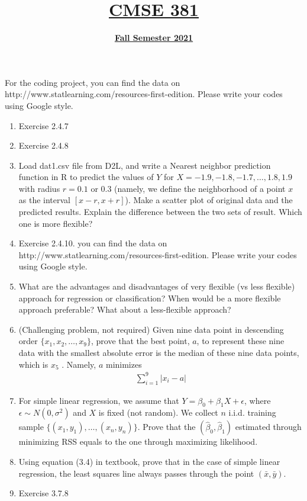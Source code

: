 \documentclass[11pt]{article}
\title{\underline{CMSE 381 }}
\author{\underline{\textbf{Fall Semester 2021}}}
\date{}
\newcommand{\blankline}{\quad\pagebreak[2]}
\begin{document}
\maketitle

\blankline

For the coding project, you can find the data on http://www.statlearning.com/resources-first-edition.  Please write your codes using Google style.
\begin{enumerate}
	\item Exercise 2.4.7
	\item Exercise 2.4.8
	\item Load dat1.csv file from D2L, and write a Nearest neighbor prediction function in R to predict the values of $Y$ for $X = -1.9, -1.8, -1.7, \ldots, 1.8, 1.9$ with radius $r = 0.1$ or $0.3$ (namely, we define the neighborhood of a point $x$ as the interval $[x-r, x + r]$). Make a scatter plot of original data and the predicted results. Explain the difference between the two sets of result. Which one is more flexible?
	\item Exercise 2.4.10. you can find the data on http://www.statlearning.com/resources-first-edition.  Please write your codes using Google style.
	\item  What are the advantages and disadvantages of very flexible (vs less flexible) approach for regression or classification? When would be a more flexible approach preferable? What about a less-flexible approach?
	\item (Challenging problem, not required) Given nine data point in descending order $\{x_1, x_2, \ldots, x_9\}$, prove that the best point, $a$, to represent these nine data with the smallest absolute error is the median of these nine data points, which is $x_5$ . Namely, $a$ minimizes 
	\begin{align*}
	   \sum_{i = 1}^{9}|x_i - a|
\end{align*}	  
		\item For simple linear regression, we assume that $Y = \beta_0 + \beta_1 X + \epsilon$, where $\epsilon \sim N(0, \sigma^2)$ and $X$ is fixed (not random). We collect $n$ i.i.d. training sample $\{(x_1, y_1), \ldots, (x_n, y_n)\}$. Prove that the $(\hat{\beta}_0, \hat{\beta}_1)$ estimated through minimizing RSS equals to the one through maximizing likelihood. 
	\item  Using equation (3.4) in textbook, prove that in the case of simple linear regression, the least squares line always passes through the point $( \bar{x}, \bar{y})$.
		\item Exercise 3.7.8

\end{enumerate}
\end{document}
